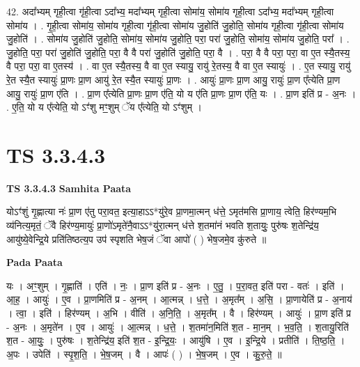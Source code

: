 \documentclass[17pt]{extarticle}
\begin{document}
42. अदा᳚भ्यम् गृही॒त्वा गृ॑ही॒त्वा ऽदा᳚भ्य॒ मदा᳚भ्यम् गृही॒त्वा सोमा॑य॒ सोमा॑य गृही॒त्वा ऽदा᳚भ्य॒ मदा᳚भ्यम् गृही॒त्वा सोमा॑य । . गृ॒ही॒त्वा सोमा॑य॒ सोमा॑य गृही॒त्वा गृ॑ही॒त्वा सोमा॑य जु॒होति॑ जु॒होति॒ सोमा॑य गृही॒त्वा गृ॑ही॒त्वा सोमा॑य जु॒होति॑ । . सोमा॑य जु॒होति॑ जु॒होति॒ सोमा॑य॒ सोमा॑य जु॒होति॒ परा॒ परा॑ जु॒होति॒ सोमा॑य॒ सोमा॑य जु॒होति॒ परा᳚ । . जु॒होति॒ परा॒ परा॑ जु॒होति॑ जु॒होति॒ परा॒ वै वै परा॑ जु॒होति॑ जु॒होति॒ परा॒ वै । . परा॒ वै वै परा॒ परा॒ वा ए॒त स्यै॒तस्य॒ वै परा॒ परा॒ वा ए॒तस्य॑ । . वा ए॒त स्यै॒तस्य॒ वै वा ए॒त स्यायु॒ रायु॑ रे॒तस्य॒ वै वा ए॒त स्यायुः॑ । . ए॒त स्यायु॒ रायु॑ रे॒त स्यै॒त स्यायुः॑ प्रा॒णः प्रा॒ण आयु॑ रे॒त स्यै॒त स्यायुः॑ प्रा॒णः । . आयुः॑ प्रा॒णः प्रा॒ण आयु॒ रायुः॑ प्रा॒ण ए᳚त्येति प्रा॒ण आयु॒ रायुः॑ प्रा॒ण ए॑ति । . प्रा॒ण ए᳚त्येति प्रा॒णः प्रा॒ण ए॑ति॒ यो य ए॑ति प्रा॒णः प्रा॒ण ए॑ति॒ यः । . प्रा॒ण इति॑ प्र - अ॒नः । . ए॒ति॒ यो य ए᳚त्येति॒ यो ऽꣳ॑शु मꣳ॒॒शुम् ॅय ए᳚त्येति॒ यो ऽꣳ॑शुम् । \newline
\pagebreak
{}

\section{ TS 3.3.4.3 }

\textbf{TS 3.3.4.3 } \newline
\textbf{Samhita Paata} \newline

योऽꣳ॑शुं गृ॒ह्णात्या नः॑ प्रा॒ण ए॑तु परा॒वत॒ इत्या॒हाऽऽ*यु॑रे॒व प्रा॒णमा॒त्मन् ध॑त्ते॒ ऽमृत॑मसि प्रा॒णाय॒ त्वेति॒ हिर॑ण्यम॒भि व्य॑नित्य॒मृतं॒ ॅवै हिर॑ण्य॒मायुः॑ प्रा॒णो॑ऽमृते॑नै॒वाऽऽ*यु॑रा॒त्मन् ध॑त्ते श॒तमा॑नं भवति श॒तायुः॒ पुरु॑षः श॒तेन्द्रि॑य॒ आयु॑ष्ये॒वेन्द्रि॒ये प्रति॑तिष्ठत्य॒प उप॑ स्पृशति भेष॒जं ॅवा आपो॑ ( ) भेष॒जमे॒व कु॑रुते ॥ \newline

\textbf{Pada Paata} \newline

यः । अꣳ॒॒शुम् । गृ॒ह्णाति॑ । एति॑ । नः॒ । प्रा॒ण इति॑ प्र - अ॒नः । ए॒तु॒ । प॒रा॒वत॒ इति॑ परा - वतः॑ । इति॑ । आ॒ह॒ । आयुः॑ । ए॒व । प्रा॒णमिति॑ प्र - अ॒नम् । आ॒त्मन्न् । ध॒त्ते॒ । अ॒मृत᳚म् । अ॒सि॒ । प्रा॒णायेति॑ प्र - अ॒नाय॑ । त्वा॒ । इति॑ । हिर॑ण्यम् । अ॒भि । वीति॑ । अ॒नि॒ति॒ । अ॒मृत᳚म् । वै । हिर॑ण्यम् । आयुः॑ । प्रा॒ण इति॑ प्र - अ॒नः । अ॒मृते॑न । ए॒व । आयुः॑ । आ॒त्मन्न् । ध॒त्ते॒ । श॒तमा॑न॒मिति॑ श॒त - मा॒न॒म् । भ॒व॒ति॒ । श॒तायु॒रिति॑ श॒त - आ॒युः॒ । पुरु॑षः । श॒तेन्द्रि॑य॒ इति॑ श॒त - इ॒न्द्रि॒यः॒ । आयु॑षि । ए॒व । इ॒न्द्रि॒ये । प्रतीति॑ । ति॒ष्ठ॒ति॒ । अ॒पः । उपेति॑ । स्पृ॒श॒ति॒ । भे॒ष॒जम् । वै । आपः॑ ( ) । भे॒ष॒जम् । ए॒व । कु॒रु॒ते॒ ॥  \newline
\end{document}
